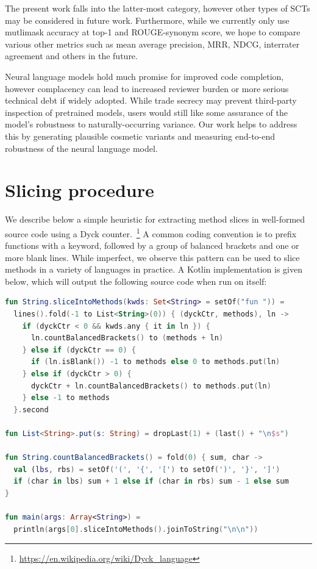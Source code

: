 \documentclass[sigconf,review,anonymous]{acmart}
\begin{document}
  The present work falls into the latter-most category, however other types of SCTs may be considered in future work. Furthermore, while we currently only use mutlimask accuracy at top-1 and ROUGE-synonym score, we hope to compare various other metrics such as mean average precision, MRR, NDCG, interrater agreement and others in the future.

  Neural language models hold much promise for improved code completion, however complacency can lead to increased reviewer burden or more serious technical debt if widely adopted. While trade secrecy may prevent third-party inspection of pretrained models, users would still like some assurance of the model's robustness to naturally-occurring variance. Our work helps to address this by generating plausible cosmetic variants and measuring end-to-end robustness of the neural language model.
  \pagebreak
  
  \appendix

  \section{Slicing procedure}\label{sec:slicing}

  We describe below a simple heuristic for extracting method slices in well-formed source code using a Dyck counter.~\footnote{\url{https://en.wikipedia.org/wiki/Dyck\_language}} A common coding convention is to prefix functions with a keyword, followed by a group of balanced brackets and one or more blank lines. While imperfect, we observe this pattern can be used to slice methods in a variety of languages in practice. A Kotlin implementation is given below, which will output the following source code when run on itself:

  \vspace{11pt}

  \begin{lstlisting}[basicstyle=\scriptsize\ttfamily, language=kotlin,label={lst:example4}]
fun String.sliceIntoMethods(kwds: Set<String> = setOf("fun ")) =
  lines().fold(-1 to List<String>(0)) { (dyckCtr, methods), ln ->
    if (dyckCtr < 0 && kwds.any { it in ln }) {
      ln.countBalancedBrackets() to (methods + ln)
    } else if (dyckCtr == 0) {
      if (ln.isBlank()) -1 to methods else 0 to methods.put(ln)
    } else if (dyckCtr > 0) {
      dyckCtr + ln.countBalancedBrackets() to methods.put(ln)
    } else -1 to methods
  }.second

fun List<String>.put(s: String) = dropLast(1) + (last() + "\n$s")

fun String.countBalancedBrackets() = fold(0) { sum, char ->
  val (lbs, rbs) = setOf('(', '{', '[') to setOf(')', '}', ']')
  if (char in lbs) sum + 1 else if (char in rbs) sum - 1 else sum
}

fun main(args: Array<String>) =
  println(args[0].sliceIntoMethods().joinToString("\n\n"))
  \end{lstlisting}
\end{document}
